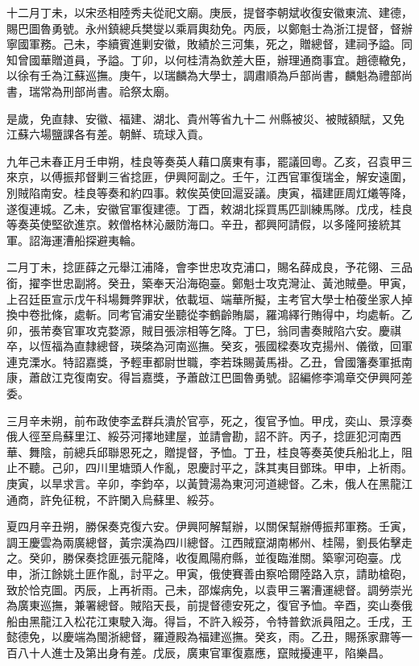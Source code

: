 \begin{pinyinscope}
十二月丁未，以宋丞相陸秀夫從祀文廟。庚辰，提督李朝斌收復安徽東流、建德，賜巴圖魯勇號。永州鎮總兵樊燮以乘肩輿劾免。丙辰，以鄭魁士為浙江提督，督辦寧國軍務。己未，李續賓進剿安徽，敗績於三河集，死之，贈總督，建祠予謚。同知曾國華贈道員，予謚。丁卯，以何桂清為欽差大臣，辦理通商事宜。趙德轍免，以徐有壬為江蘇巡撫。庚午，以瑞麟為大學士，調肅順為戶部尚書，麟魁為禮部尚書，瑞常為刑部尚書。祫祭太廟。

是歲，免直隸、安徽、福建、湖北、貴州等省九十二州縣被災、被賊額賦，又免江蘇六場鹽課各有差。朝鮮、琉球入貢。

九年己未春正月壬申朔，桂良等奏英人藉口廣東有事，罷議回粵。乙亥，召袁甲三來京，以傅振邦督剿三省捻匪，伊興阿副之。壬午，江西官軍復瑞金，解安遠圍，別賊陷南安。桂良等奏和約四事。敕俟英使回滬妥議。庚寅，福建匪周灴爔等降，遂復連城。乙未，安徽官軍復建德。丁酉，敕湖北採買馬匹訓練馬隊。戊戌，桂良等奏英使堅欲進京。敕僧格林沁嚴防海口。辛丑，都興阿請假，以多隆阿接統其軍。詔海運漕船探避夷輪。

二月丁未，捻匪薛之元舉江浦降，會李世忠攻克浦口，賜名薛成良，予花翎、三品銜，擢李世忠副將。癸丑，築奉天沿海砲臺。鄭魁士攻克灣沚、黃池賊壘。甲寅，上召廷臣宣示戊午科場舞弊罪狀，依載垣、端華所擬，主考官大學士柏葰坐家人掉換中卷批條，處斬。同考官浦安坐聽從李鶴齡賄屬，羅鴻繹行賄得中，均處斬。乙卯，張芾奏官軍攻克婺源，賊目張淙相等乞降。丁巳，翁同書奏賊陷六安。慶祺卒，以恆福為直隸總督，瑛棨為河南巡撫。癸亥，張國樑奏攻克揚州、儀徵，回軍連克溧水。特詔嘉獎，予輕車都尉世職，李若珠賜黃馬褂。乙丑，曾國籓奏軍抵南康，蕭啟江克復南安。得旨嘉獎，予蕭啟江巴圖魯勇號。詔編修李鴻章交伊興阿差委。

三月辛未朔，前布政使李孟群兵潰於官亭，死之，復官予恤。甲戌，奕山、景淳奏俄人徑至烏蘇里江、綏芬河擇地建屋，並請會勘，詔不許。丙子，捻匪犯河南西華、舞陰，前總兵邱聯恩死之，贈提督，予恤。丁丑，桂良等奏英使兵船北上，阻止不聽。己卯，四川里塘頭人作亂，恩慶討平之，誅其夷目鄧珠。甲申，上祈雨。庚寅，以旱求言。辛卯，李鈞卒，以黃贊湯為東河河道總督。乙未，俄人在黑龍江通商，許免征稅，不許闌入烏蘇里、綏芬。

夏四月辛丑朔，勝保奏克復六安。伊興阿解幫辦，以關保幫辦傅振邦軍務。壬寅，調王慶雲為兩廣總督，黃宗漢為四川總督。江西賊竄湖南郴州、桂陽，劉長佑擊走之。癸卯，勝保奏捻匪張元龍降，收復鳳陽府縣，並復臨淮關。築寧河砲臺。戊申，浙江餘姚土匪作亂，討平之。甲寅，俄使賽善由察哈爾陸路入京，請助槍砲，致於恰克圖。丙辰，上再祈雨。己未，邵燦病免，以袁甲三署漕運總督。調勞崇光為廣東巡撫，兼署總督。賊陷天長，前提督德安死之，復官予恤。辛酉，奕山奏俄船由黑龍江入松花江東駛入海。得旨，不許入綏芬，令特普欽派員阻之。壬戌，王懿德免，以慶端為閩浙總督，羅遵殿為福建巡撫。癸亥，雨。乙丑，賜孫家鼐等一百八十人進士及第出身有差。戊辰，廣東官軍復嘉應，竄賊擾連平，陷樂昌。


\end{pinyinscope}
